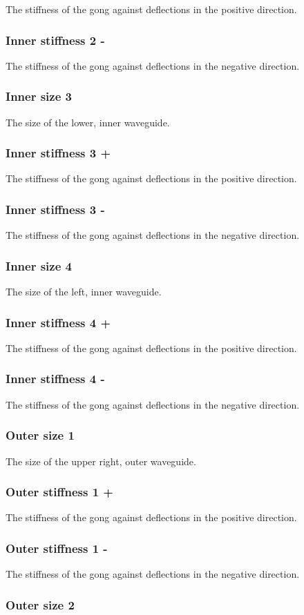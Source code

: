 \documentclass[11pt]{article}
\begin{document}
The stiffness of the gong against deflections in the positive direction.\subsubsection*{Inner stiffness 2 -}
The stiffness of the gong against deflections in the negative direction.\subsubsection*{Inner size 3}
The size of the lower, inner waveguide.\subsubsection*{Inner stiffness 3 +}
The stiffness of the gong against deflections in the positive direction.\subsubsection*{Inner stiffness 3 -}
The stiffness of the gong against deflections in the negative direction.\subsubsection*{Inner size 4}
The size of the left, inner waveguide.\subsubsection*{Inner stiffness 4 +}
The stiffness of the gong against deflections in the positive direction.\subsubsection*{Inner stiffness 4 -}
The stiffness of the gong against deflections in the negative direction.\subsubsection*{Outer size 1}
The size of the upper right, outer waveguide.\subsubsection*{Outer stiffness 1 +}
The stiffness of the gong against deflections in the positive direction.\subsubsection*{Outer stiffness 1 -}
The stiffness of the gong against deflections in the negative direction.\subsubsection*{Outer size 2}
\end{document}
